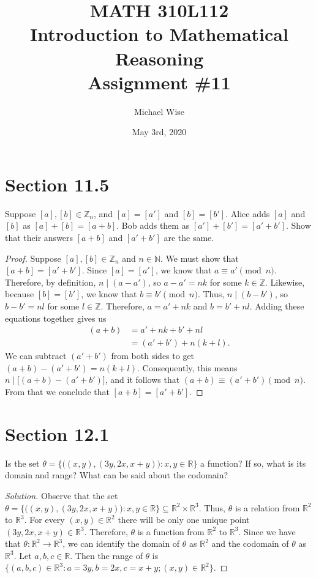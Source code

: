 \documentclass[12pt]{article}
\title{MATH 310L112\\
       Introduction to Mathematical Reasoning\\
       Assignment \#11}
\author{Michael Wise}
\date{May 3rd, 2020}
\begin{document}
\maketitle
\begin{description}
\section*{Section 11.5}
\item[Exercise 8:] Suppose $[a], [b] \in \mathbb{Z}_n$, and $[a] = [a']$ and $[b] = [b']$. Alice adds $[a]$ and $[b]$ as $[a] + [b] = [a+b]$. Bob adds them as $[a'] + [b'] = [a'+b']$. Show that their answers $[a+b]$ and $[a'+ b']$ are the same.
\begin{spacing}{2}
\begin{proof}
Suppose $[a], [b] \in \mathbb{Z}_n$ and $n \in \mathbb{N}$. We must show that $[a+b] = [a' + b']$. Since $[a] = [a']$, we know that $a \equiv a' \pmod{n}$. Therefore, by definition, $n \mid (a - a')$, so $a-a' = nk$ for some $k \in \mathbb{Z}$. Likewise, because $[b] = [b']$, we know that $b \equiv b' \pmod{n}$. Thus, $n \mid (b - b')$, so $b-b' = nl$ for some $l \in \mathbb{Z}$. Therefore, $a = a' + nk$ and $b = b' + nl$. Adding these equations together gives us
\begin{align*}
    (a + b) &= a' + nk + b' + nl \\
    &= (a' + b') + n(k+l).
\end{align*}
We can subtract $(a' + b' )$ from both sides to get $(a + b) - (a' + b') = n(k+l)$. Consequently, this means $n \mid \big[(a + b) - (a' + b')\big]$, and it follows that $(a+b) \equiv (a' + b') \pmod{n}$. From that we conclude that $[a+b] = [a' + b']$.
\end{proof}
\end{spacing}
\section*{Section 12.1}
\item[Exercise 12:] Is the set $\theta = \{\big((x,y), (3y,2x,x+y)\big) : x,y \in \mathbb{R}\}$ a function? If so, what is its domain and range? What can be said about the codomain?
\begin{spacing}{2}
\begin{proof}[Solution]
Observe that the set $\theta = \{\big((x,y), (3y,2x,x+y)\big) : x,y \in \mathbb{R}\} \subseteq \mathbb{R}^2 \times \mathbb{R}^3$. Thus, $\theta$ is a relation from $\mathbb{R}^2$ to $\mathbb{R}^3$. For every $(x,y) \in \mathbb{R}^2$ there will be only one unique point $(3y,2x,x+y) \in \mathbb{R}^3$. Therefore, $\theta$ is a function from $\mathbb{R}^2$ to $\mathbb{R}^3$.
\newline
Since we have that $\theta:\mathbb{R}^2 \to \mathbb{R}^3$, we can identify the domain of $\theta$ as $\mathbb{R}^2$ and the codomain of $\theta$ as $\mathbb{R}^3$. Let $a,b,c \in \mathbb{R}$. Then the range of $\theta$ is $\{(a,b,c) \in \mathbb{R}^3: a=3y, b=2x, c=x+y; (x,y) \in \mathbb{R}^2\}$.
\end{proof}
\end{spacing} 

\end{description}
\end{document}
